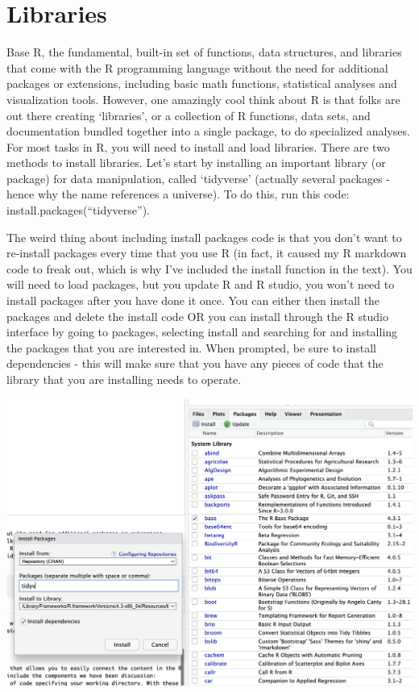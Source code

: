 \documentclass[
]{book}
\begin{document}
\hypertarget{libraries}{%
\section{Libraries}\label{libraries}}

Base R, the fundamental, built-in set of functions, data structures, and libraries that come with the R programming language without the need for additional packages or extensions, including basic math functions, statistical analyses and visualization tools. However, one amazingly cool think about R is that folks are out there creating `libraries', or a collection of R functions, data sets, and documentation bundled together into a single package, to do specialized analyses. For most tasks in R, you will need to install and load libraries. There are two methods to install libraries. Let's start by installing an important library (or package) for data manipulation, called `tidyverse' (actually several packages - hence why the name references a universe). To do this, run this code: install.packages(``tidyverse'').

The weird thing about including install packages code is that you don't want to re-install packages every time that you use R (in fact, it caused my R markdown code to freak out, which is why I've included the install function in the text). You will need to load packages, but you update R and R studio, you won't need to install packages after you have done it once. You can either then install the packages and delete the install code OR you can install through the R studio interface by going to packages, selecting install and searching for and installing the packages that you are interested in. When prompted, be sure to install dependencies - this will make sure that you have any pieces of code that the library that you are installing needs to operate.

\includegraphics{images/01-intro/installlibraries.png}
\end{document}
